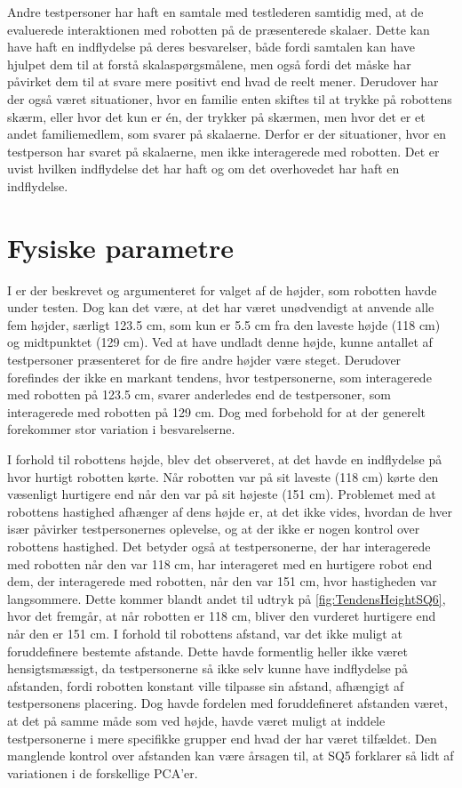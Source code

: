 Andre testpersoner har haft en samtale med testlederen samtidig med, at de evaluerede interaktionen med robotten på de præsenterede skalaer. Dette kan have haft en indflydelse på deres besvarelser, både fordi samtalen kan have hjulpet dem til at forstå skalaspørgsmålene, men også fordi det måske har påvirket dem til at svare mere positivt end hvad de reelt mener. Derudover har der også været situationer, hvor en familie enten skiftes til at trykke på robottens skærm, eller hvor det kun er én, der trykker på skærmen, men hvor det er et andet familiemedlem, som svarer på skalaerne. Derfor er der situationer, hvor en testperson har svaret på skalaerne, men ikke interagerede med robotten. Det er uvist hvilken indflydelse det har haft og om det overhovedet har haft en indflydelse.  


\section{Fysiske parametre}
\label{DiskussionFysiskeParametre}
%
I  er der beskrevet og argumenteret for valget af de højder, som robotten havde under testen. Dog kan det være, at det har været unødvendigt at anvende alle fem højder, særligt 123.5 cm, som kun er 5.5 cm fra den laveste højde (118 cm) og midtpunktet (129 cm). Ved at have undladt denne højde, kunne antallet af testpersoner præsenteret for de fire andre højder være steget. Derudover forefindes der ikke en markant tendens, hvor testpersonerne, som interagerede med robotten på 123.5 cm, svarer anderledes end de testpersoner, som interagerede med robotten på 129 cm. Dog med forbehold for at der generelt forekommer stor variation i besvarelserne. 

I forhold til robottens højde, blev det observeret, at det havde en indflydelse på hvor hurtigt robotten kørte. Når robotten var på sit laveste (118 cm) kørte den væsenligt hurtigere end når den var på sit højeste (151 cm). Problemet med at robottens hastighed afhænger af dens højde er, at det ikke vides, hvordan de hver især påvirker testpersonernes oplevelse, og at der ikke er nogen kontrol over robottens hastighed. Det betyder også at testpersonerne, der har interagerede med robotten når den var 118 cm, har interageret med en hurtigere robot end dem, der interagerede med robotten, når den var 151 cm, hvor hastigheden var langsommere. Dette kommer blandt andet til udtryk på \autoref{fig:TendensHeightSQ6}, hvor det fremgår, at når robotten er 118 cm, bliver den vurderet hurtigere end når den er 151 cm. \blankline
%
I forhold til robottens afstand, var det ikke muligt at foruddefinere bestemte afstande. Dette havde formentlig heller ikke været hensigtsmæssigt, da testpersonerne så ikke selv kunne have indflydelse på afstanden, fordi robotten konstant ville tilpasse sin afstand, afhængigt af testpersonens placering. Dog havde fordelen med foruddefineret afstanden været, at det på samme måde som ved højde, havde været muligt at inddele testpersonerne i mere specifikke grupper end hvad der har været tilfældet. Den manglende kontrol over afstanden kan være årsagen til, at SQ5 forklarer så lidt af variationen i de forskellige PCA'er.

